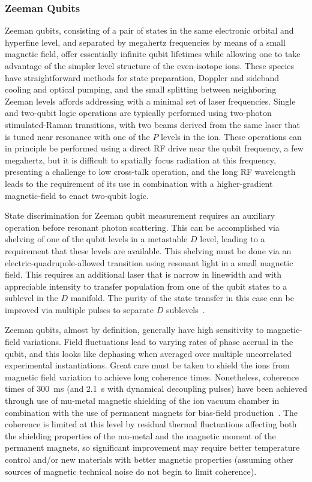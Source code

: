 \documentclass[%
12pt,
 amsmath,amssymb,
]{revtex4-2}
\begin{document}
\subsubsection{Zeeman Qubits}
\label{subsubZeeman}

Zeeman qubits, consisting of a pair of states in the same electronic orbital and hyperfine level, and separated by megahertz frequencies by means of a small magnetic field, offer essentially infinite qubit lifetimes while allowing one to take advantage of the simpler level structure of the even-isotope ions.  These species have straightforward methods for state preparation, Doppler and sideband cooling and optical pumping, and the small splitting between neighboring Zeeman levels affords addressing with a minimal set of laser frequencies.  Single and two-qubit logic operations are typically performed using two-photon stimulated-Raman transitions, with two beams derived from the same laser that is tuned near resonance with one of the $P$ levels in the ion.  These operations can in principle be performed using a direct RF drive near the qubit frequency, a few megahertz, but it is difficult to spatially focus radiation at this frequency, presenting a challenge to low cross-talk operation, and the long RF wavelength leads to the requirement of its use in combination with a higher-gradient magnetic-field to enact two-qubit logic.

State discrimination for Zeeman qubit measurement requires an auxiliary operation before resonant photon scattering.  This can be accomplished via shelving of one of the qubit levels in a metastable $D$ level, leading to a requirement that these levels are available.  This shelving must be done via an electric-quadrupole-allowed transition using resonant light in a small magnetic field.  This requires an additional laser that is narrow in linewidth and with appreciable intensity to transfer population from one of the qubit states to a sublevel in the $D$ manifold.  The purity of the state transfer in this case can be improved via multiple pulses to separate $D$ sublevels~\cite{KeselmanZeemanQubit2011}.

Zeeman qubits, almost by definition, generally have high sensitivity to magnetic-field variations.  Field fluctuations lead to varying rates of phase accrual in the qubit, and this looks like dephasing when averaged over multiple uncorrelated experimental instantiations.  Great care must be taken to shield the ions from magnetic field variation to achieve long coherence times.  Nonetheless, coherence times of 300~ms (and 2.1~s with dynamical decoupling pulses) have been achieved through use of mu-metal magnetic shielding of the ion vacuum chamber in combination with the use of permanent magnets for bias-field production~\cite{Ruster2016}.  The coherence is limited at this level by residual thermal fluctuations affecting both the shielding properties of the mu-metal and the magnetic moment of the permanent magnets, so significant improvement may require better temperature control and/or new materials with better magnetic properties (assuming other sources of magnetic technical noise do not begin to limit coherence).
\end{document}
